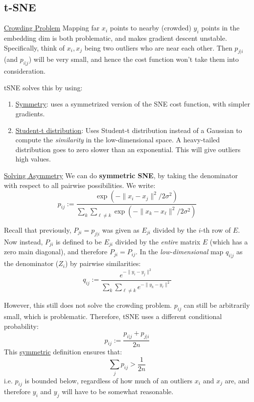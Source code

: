 \documentclass{article}
\begin{document}
\subsection{t-SNE}
\ul{Crowding Problem} Mapping far $x_i$ points to nearby (crowded) $y_i$  points in the embedding dim is both problematic, and makes gradient descent unstable. Specifically, think of $x_i, x_j$ being two outliers who are near each other. Then $p_{j|i}$ (and $p_{i|j}$) will be very small, and hence the cost function won't take them into consideration. 

tSNE solves this by using:
\begin{enumerate}

  \item \ul{Symmetry}: uses a symmetrized version of the SNE cost function, with simpler gradients.
  \item \ul{Student-t distribution}: Uses Student-t distribution instead of a Gaussian to compute the \textit{similarity} in the low-dimensional space. A heavy-tailed distribution goes to zero slower than an exponential. This will give outliers high values.  

\end{enumerate}


\ul{Solving Asymmetry} We can do \textbf{symmetric SNE}, by taking the denominator with respect to all pairwise possibilities. We write:
\[
  p_{ij} := \frac{\exp(- \lVert x_i -x_j \rVert^2 / 2 \sigma ^2) } {\sum_{k} \sum_{\ell \neq k } \exp(- \lVert x_k - x_{\ell} \rVert ^2 / 2 \sigma ^2 ) }
\]

Recall that previously, $P_{ji}=p_{j|i}$ was given as $E_{ji}$ divided by the $i$-th row of $E$. Now instead, $P_{ji}$ is defined to be $E_{ji}$ divided by the \textit{entire} matrix $E$ (which has a zero main diagonal), and therefore $P_{ji}=P_{ij}$. 
In the \textit{low-dimensional} map $q_{i|j}$ as  the denominator ($Z_i$) by pairwise similarities:
\[
  q_{ij} := \frac{e^{- \lVert y_i -y_j \rVert^2 } } {\sum_{k} \sum_{\ell \neq k } e^{- \lVert y_k - y_{\ell} \rVert ^2}   } 
\]

However, this still does not solve the crowding problem. $p_{ij}$ can still be arbitrarily small, which is problematic. Therefore, tSNE uses a different conditional probability:
  \[
    p_{ij} := \frac{p_{i|j} + p_{j|i}}{2n}
  \]
This \ul{symmetric} definition ensures that:
\[
  \sum_{j} p_{ij} > \frac{1}{2n}
\]
i.e. $p_{ij}$ is bounded below, regardless of how much of an outliers $x_i$ and $x_j$ are, and therefore $y_i$ and $y_j$ will have to be somewhat reasonable.  
\end{document}

